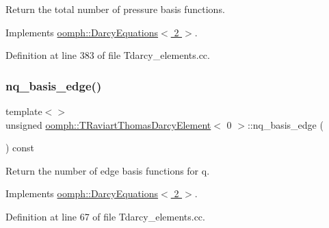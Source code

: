 Return the total number of pressure basis functions. 



Implements \hyperlink{classoomph_1_1DarcyEquations_a2a27050f99b0dd3ab6686807fa84f866}{oomph\+::\+Darcy\+Equations$<$ 2 $>$}.



Definition at line 383 of file Tdarcy\+\_\+elements.\+cc.

\mbox{\label{classoomph_1_1TRaviartThomasDarcyElement_a9b4ab72d9ab1142f3f68737935bc0075}} 
\subsubsection{\texorpdfstring{nq\+\_\+basis\+\_\+edge()}{nq\_basis\_edge()}\hspace{0.1cm}{\footnotesize\ttfamily [1/3]}}
{\footnotesize\ttfamily template$<$$>$ \\
unsigned \hyperlink{classoomph_1_1TRaviartThomasDarcyElement}{oomph\+::\+T\+Raviart\+Thomas\+Darcy\+Element}$<$ 0 $>$\+::nq\+\_\+basis\+\_\+edge (\begin{DoxyParamCaption}{ }\end{DoxyParamCaption}) const\hspace{0.3cm}{\ttfamily [virtual]}}



Return the number of edge basis functions for q. 



Implements \hyperlink{classoomph_1_1DarcyEquations_a13cbb6dce25734c0d3844466b0435d17}{oomph\+::\+Darcy\+Equations$<$ 2 $>$}.



Definition at line 67 of file Tdarcy\+\_\+elements.\+cc.

\mbox{\label{classoomph_1_1TRaviartThomasDarcyElement_af8ab0d926cdbb46da734e4db8461a2e5}} 
